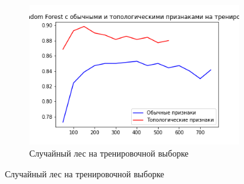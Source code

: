 \documentclass{beamer}
\begin{document}
\begin{frame}
\begin{figure}[!htbp]
\begin{subfigure}{0.25\textwidth}
					\includegraphics[width=\linewidth]{rf_diff_features_train.png}
					\caption{Случайный лес на тренировочной выборке}
					\label{fig:3}
				\end{subfigure}
				

\end{figure}
\end{frame}
\end{document}
